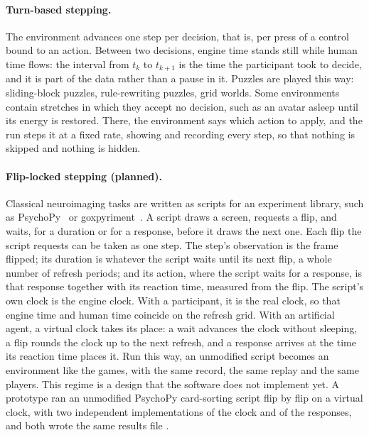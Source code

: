 \paragraph{Turn-based stepping.}
The environment advances one step per decision, that is, per press of a control bound to an action.
Between two decisions, engine time stands still while human time flows: the interval from $t_k$ to $t_{k+1}$ is the time the participant took to decide, and it is part of the data rather than a pause in it.
Puzzles are played this way: sliding-block puzzles, rule-rewriting puzzles, grid worlds.
Some environments contain stretches in which they accept no decision, such as an avatar asleep until its energy is restored.
There, the environment says which action to apply, and the run steps it at a fixed rate, showing and recording every step, so that nothing is skipped and nothing is hidden.

\paragraph{Flip-locked stepping (planned).}
Classical neuroimaging tasks are written as scripts for an experiment library, such as PsychoPy~\citep{peirce2019psychopy} or goxpyriment~\citep{pallier2026goxpyriment}.
A script draws a screen, requests a flip, and waits, for a duration or for a response, before it draws the next one.
Each flip the script requests can be taken as one step.
The step's observation is the frame flipped; its duration is whatever the script waits until its next flip, a whole number of refresh periods; and its action, where the script waits for a response, is that response together with its reaction time, measured from the flip.
The script's own clock is the engine clock.
With a participant, it is the real clock, so that engine time and human time coincide on the refresh grid.
With an artificial agent, a virtual clock takes its place: a wait advances the clock without sleeping, a flip rounds the clock up to the next refresh, and a response arrives at the time its reaction time places it.
Run this way, an unmodified script becomes an environment like the games, with the same record, the same replay and the same players.
This regime is a design that the software does not implement yet.
A prototype ran an unmodified PsychoPy card-sorting script flip by flip on a virtual clock, with two independent implementations of the clock and of the responses, and both wrote the same results file .

